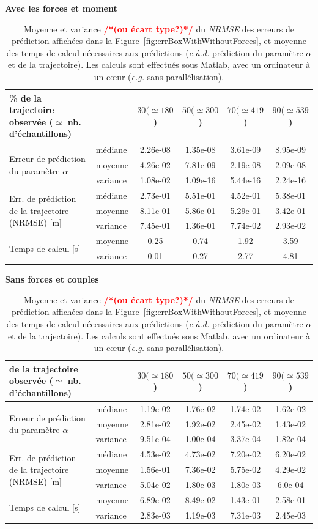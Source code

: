 \documentclass[utf8]{frontiersSCNS} %
\newcommand{\todo}[1]{\textcolor{red}{\textbf{/*#1*/}}}
\begin{document}
\begin{table}
\begin{center}
\textbf{Avec les forces et moment}
\begin{tabular}{|p{3.6cm}|p{2cm}|c|c|c|c|}
  \hline 
   \% de la trajectoire observée ($\simeq$ nb. d'échantillons) &  & \textbf{$30 (\simeq 180$)} & \textbf{$50 (\simeq 300$)} & \textbf{$70 (\simeq 419$)} & \textbf{$90 (\simeq 539$)}  \tabularnewline
  \hline
\multirow{3}{3cm}{Erreur de prédiction du paramètre $\alpha$} &  médiane & 2.26e-08 & 1.35e-08 & 3.61e-09 & 8.95e-09 \tabularnewline
  \cline{2-6} & moyenne & 4.26e-02 & 7.81e-09 & 2.19e-08 & 2.09e-08 \tabularnewline
 \cline{2-6} & variance & 1.08e-02 & 1.09e-16 & 5.44e-16 & 2.24e-16 \tabularnewline
  \hline
\multirow{3}{3cm}{Err. de prédiction de la trajectoire (NRMSE) [m]} &  médiane & 2.73e-01 & 5.51e-01 & 4.52e-01 & 5.38e-01 \tabularnewline
  \cline{2-6} & moyenne & 8.11e-01 & 5.86e-01 & 5.29e-01 & 3.42e-01 \tabularnewline
 \cline{2-6} & variance & 7.45e-01 & 1.36e-01 & 7.74e-02 & 2.93e-02 \tabularnewline
  \hline  
\multirow{2}{3cm}{Temps de calcul [s]} &  moyenne & 0.25 & 0.74 & 1.92 & 3.59 \tabularnewline
 \cline{2-6} & variance & 0.01 & 0.27 & 2.77 & 4.81 \tabularnewline
 \hline
\end{tabular}

\vspace{0.4cm}
\textbf{Sans forces et couples}
\begin{tabular}{|p{3.6cm}|p{2cm}|c|c|c|c|}
  \hline 
   de la trajectoire observée ($\simeq$ nb. d'échantillons) &  & \textbf{$30 (\simeq 180$)} & \textbf{$50 (\simeq 300$)} & \textbf{$70 (\simeq 419$)} & \textbf{$90 (\simeq 539$)}  \tabularnewline
  \hline
\multirow{3}{3cm}{Erreur de prédiction du paramètre $\alpha$} &  médiane & 1.19e-02 & 1.76e-02 & 1.74e-02 & 1.62e-02 \tabularnewline
  \cline{2-6} & moyenne & 2.81e-02 & 1.92e-02 & 2.45e-02 & 1.43e-02 \tabularnewline
 \cline{2-6} & variance & 9.51e-04 & 1.00e-04 & 3.37e-04 & 1.82e-04 \tabularnewline
  \hline
\multirow{3}{3cm}{Err. de prédiction de la trajectoire (NRMSE) [m]} & médiane & 4.53e-02 & 4.73e-02 & 7.20e-02 & 6.20e-02 \tabularnewline
  \cline{2-6} & moyenne & 1.56e-01 & 7.36e-02 & 5.75e-02 & 4.29e-02 \tabularnewline
 \cline{2-6} & variance & 5.04e-02 & 1.80e-03 & 1.80e-03 & 6.0e-04 \tabularnewline
  \hline  
\multirow{2}{3cm}{Temps de calcul [s]} &  moyenne & 6.89e-02 & 8.49e-02 & 1.43e-01 & 2.58e-01 \tabularnewline
 \cline{2-6} & variance & 2.83e-03 & 1.19e-03 & 7.31e-03 & 2.45e-03 \tabularnewline
 \hline
\end{tabular}
\end{center}
\caption{Moyenne et variance \todo{(ou écart type?)} du \textit{NRMSE} des erreurs de prédiction affichées dans la Figure~\ref{fig:errBoxWithWithoutForces}, et moyenne des temps de calcul nécessaires aux prédictions (\textit{c.à.d.} prédiction du paramètre $\alpha$ et de la trajectoire). Les calculs sont effectués sous Matlab, avec un ordinateur à un cœur (\textit{e.g.} sans parallélisation).}
\normalcolor
\label{table:statsError}
\end{table}
\end{document}
